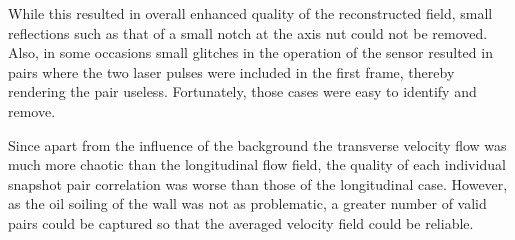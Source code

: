 While this resulted in overall enhanced quality of the reconstructed field, small reflections such as that of a small notch at the axis nut could not be removed. Also, in some occasions small glitches in the operation of the sensor resulted in pairs where the two laser pulses were included in the first frame, thereby rendering the pair useless. Fortunately, those cases were easy to identify and remove.

Since apart from the influence of the background the transverse velocity flow was much more chaotic than the longitudinal flow field, the quality of each individual snapshot pair correlation was worse than those of the longitudinal case. However, as the oil soiling of the wall was not as problematic, a greater number of valid pairs could be captured so that the averaged velocity field could be reliable.

